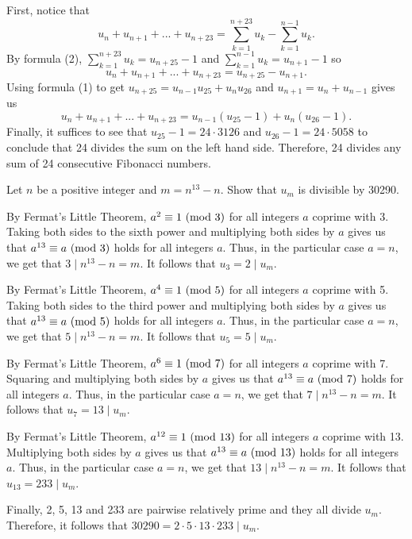 \begin{solution}
    First, notice that
    $$u_n + u_{n+1} + ... + u_{n+23} = \sum_{k=1}^{n+23}u_k - \sum_{k=1}^{n-1}u_k.$$
    By formula (2), $\sum_{k=1}^{n+23}u_k = u_{n+25} - 1$ and $\sum_{k=1}^{n-1}u_k = u_{n+1} -1$ so
    $$u_n + u_{n+1} + ... + u_{n+23} = u_{n+25} - u_{n+1}.$$
    Using formula (1) to get $u_{n+25} = u_{n-1}u_{25} + u_nu_{26}$ and $u_{n+1} = u_n + u_{n-1}$ gives us
    $$u_n + u_{n+1} + ... + u_{n+23} = u_{n-1}(u_{25} - 1) + u_n(u_{26} - 1).$$
    Finally, it suffices to see that $u_{25} - 1 = 24\cdot 3126$ and $u_{26} - 1 = 24\cdot 5058$ to conclude that 24 divides the sum on the left hand side. Therefore, 24 divides any sum of 24 consecutive Fibonacci numbers. \\
\end{solution}

\begin{exercise}
    Let $n$ be a positive integer and $m = n^{13} - n$. Show that $u_m$ is divisible by 30290.  \\
\end{exercise}

\begin{solution}
    By Fermat's Little Theorem, $a^2 \equiv 1 \ (\mathrm{mod}\ 3)$ for all integers $a$ coprime with 3. Taking both sides to the sixth power and multiplying both sides by $a$ gives us that $a^{13}\equiv a \ (\mathrm{mod}\ 3)$ holds for all integers $a$. Thus, in the particular case $a = n$, we get that $3 \mid n^{13} - n = m$. It follows that $u_3 = 2 \mid u_m$.

    By Fermat's Little Theorem, $a^4 \equiv 1 \ (\mathrm{mod}\ 5)$ for all integers $a$ coprime with 5. Taking both sides to the third power and multiplying both sides by $a$ gives us that $a^{13}\equiv a \ (\mathrm{mod}\ 5)$ holds for all integers $a$. Thus, in the particular case $a = n$, we get that $5 \mid n^{13} - n = m$. It follows that $u_5 = 5 \mid u_m$.

    By Fermat's Little Theorem, $a^6 \equiv 1 \ (\mathrm{mod}\ 7)$ for all integers $a$ coprime with 7. Squaring and multiplying both sides by $a$ gives us that $a^{13}\equiv a \ (\mathrm{mod}\ 7)$ holds for all integers $a$. Thus, in the particular case $a = n$, we get that $7 \mid n^{13} - n = m$. It follows that $u_7 = 13 \mid u_m$.

    By Fermat's Little Theorem, $a^{12} \equiv 1 \ (\mathrm{mod}\ 13)$ for all integers $a$ coprime with 13. Multiplying both sides by $a$ gives us that $a^{13}\equiv a \ (\mathrm{mod}\ 13)$ holds for all integers $a$. Thus, in the particular case $a = n$, we get that $13 \mid n^{13} - n = m$. It follows that $u_{13} = 233 \mid u_m$.

    Finally, 2, 5, 13 and 233 are pairwise relatively prime and they all divide $u_m$. Therefore, it follows that $30290 = 2\cdot 5 \cdot 13 \cdot 233 \mid u_m$.
\end{solution}